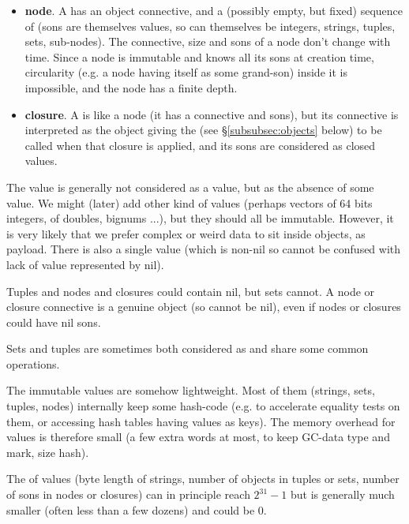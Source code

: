 \begin{itemize}
  \item \textbf{node}. A  has an object connective,
    and a (possibly empty, but fixed) sequence of 
    (sons are themselves values, so can themselves be integers,
    strings, tuples, sets, sub-nodes). The connective, size and sons
    of a node don't change with time. Since a node is immutable and
    knows all its sons at creation time, circularity (e.g. a node
    having itself as some grand-son) inside it is impossible, and the
    node has a finite depth.

  \item \textbf{closure}. A  is like a node
    (it has a connective and sons), but its connective is interpreted
    as the object giving the  (see
    \S\ref{subsubsec:objects} below) to be called when that closure is
    applied, and its sons are considered as closed values.
        
\end{itemize}

The  value is generally not considered as a
value, but as the absence of some value. We might (later) add other
kind of values (perhaps vectors of 64 bits integers, of doubles,
bignums ...), but they should all be immutable. However, it is very
likely that we prefer complex or weird data to sit inside objects, as
payload. There is also a single
 value (which is non-nil so
cannot be confused with lack of value represented by nil).

Tuples and nodes and closures could contain nil, but sets cannot. A
node or closure connective is a genuine object (so cannot be nil),
even if nodes or closures could have nil sons.

Sets and tuples are sometimes both considered as
 and share some common operations.

The immutable values are somehow lightweight. Most of them (strings,
sets, tuples, nodes) internally keep some hash-code (e.g. to
accelerate equality tests on them, or accessing hash tables having
values as keys). The memory overhead for values is therefore small (a
few extra words at most, to keep GC-data type and mark, size hash).

The  of values (byte length of strings, number of objects in
tuples or sets, number of sons in nodes or closures) can in principle reach
$2^{31} - 1$ but is generally much smaller (often less than a few
dozens) and could be 0.

